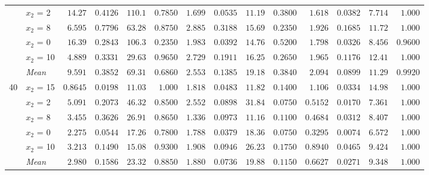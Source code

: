 \begin{table}[htbp]
\begin{tabular}{llrrrrrrrrrrrr}
 & $x_2$ = 2 & $14.27$ & $0.4126$ & $110.1$ & $0.7850$ & $1.699$ & $0.0535$ & $11.19$ & $0.3800$ & {\boldmath$1.618$} & {\boldmath$0.0382$} & {\boldmath$7.714$} & {\boldmath$1.000$} \\
 & $x_2$ = 8 & $6.595$ & $0.7796$ & $63.28$ & {\boldmath$0.8750$} & $2.885$ & $0.3188$ & $15.69$ & $0.2350$ & {\boldmath$1.926$} & {\boldmath$0.1685$} & {\boldmath$11.72$} & $1.000$ \\
 & $x_2$ = 0 & $16.39$ & $0.2843$ & $106.3$ & $0.2350$ & $1.983$ & $0.0392$ & $14.76$ & $0.5200$ & {\boldmath$1.798$} & {\boldmath$0.0326$} & {\boldmath$8.456$} & {\boldmath$0.9600$} \\
 & $x_2$ = 10 & $4.889$ & $0.3331$ & $29.63$ & {\boldmath$0.9650$} & $2.729$ & $0.1911$ & $16.25$ & $0.2650$ & {\boldmath$1.965$} & {\boldmath$0.1176$} & {\boldmath$12.41$} & $1.000$ \\
 & \textit{Mean} & $9.591$ & $0.3852$ & $69.31$ & $0.6860$ & $2.553$ & $0.1385$ & $19.18$ & $0.3840$ & \colorbox{green!20}{\boldmath$2.094$} & \colorbox{green!20}{\boldmath$0.0899$} & \colorbox{green!20}{\boldmath$11.29$} & \colorbox{green!20}{\boldmath$0.9920$} \\
\midrule
\multirow{6}{*}{40} & $x_2$ = 15 & {\boldmath$0.8645$} & {\boldmath$0.0198$} & {\boldmath$11.03$} & {\boldmath$1.000$} & $1.818$ & $0.0483$ & $11.82$ & $0.1400$ & $1.106$ & $0.0334$ & $14.98$ & $1.000$ \\
 & $x_2$ = 2 & $5.091$ & $0.2073$ & $46.32$ & {\boldmath$0.8500$} & $2.552$ & $0.0898$ & $31.84$ & $0.0750$ & {\boldmath$0.5152$} & {\boldmath$0.0170$} & {\boldmath$7.361$} & $1.000$ \\
 & $x_2$ = 8 & $3.455$ & $0.3626$ & $26.91$ & {\boldmath$0.8650$} & $1.336$ & $0.0973$ & $11.16$ & $0.1100$ & {\boldmath$0.4684$} & {\boldmath$0.0312$} & {\boldmath$8.407$} & $1.000$ \\
 & $x_2$ = 0 & $2.275$ & $0.0544$ & $17.26$ & $0.7800$ & $1.788$ & $0.0379$ & $18.36$ & $0.0750$ & {\boldmath$0.3295$} & {\boldmath$0.0074$} & {\boldmath$6.572$} & {\boldmath$1.000$} \\
 & $x_2$ = 10 & $3.213$ & $0.1490$ & $15.08$ & {\boldmath$0.9300$} & $1.908$ & $0.0946$ & $26.23$ & $0.1750$ & {\boldmath$0.8940$} & {\boldmath$0.0465$} & {\boldmath$9.424$} & $1.000$ \\
 & \textit{Mean} & $2.980$ & $0.1586$ & $23.32$ & \colorbox{green!20}{\boldmath$0.8850$} & $1.880$ & $0.0736$ & $19.88$ & $0.1150$ & \colorbox{green!20}{\boldmath$0.6627$} & \colorbox{green!20}{\boldmath$0.0271$} & \colorbox{green!20}{\boldmath$9.348$} & $1.000$ \\
\bottomrule
\end{tabular}
\end{table}

